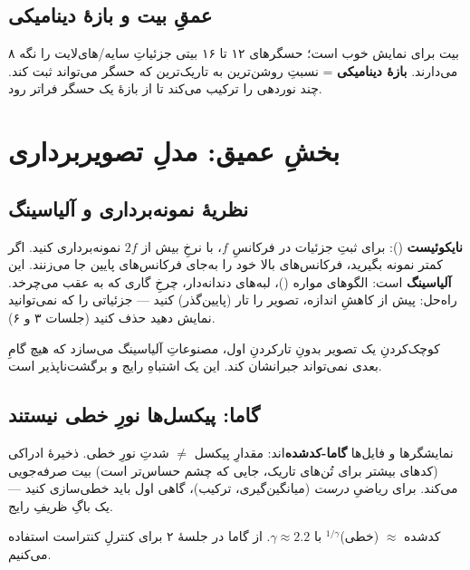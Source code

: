 \documentclass[12pt,a4paper]{article}
\begin{document}
\subsection{عمقِ بیت و بازهٔ دینامیکی}

۸ بیت برای نمایش خوب است؛ حسگرهای ۱۲ تا ۱۶ بیتی جزئیاتِ سایه/های‌لایت را نگه می‌دارند.
\textbf{بازهٔ دینامیکی} = نسبتِ روشن‌ترین به تاریک‌ترین که حسگر می‌تواند ثبت کند.  چند
نوردهی را ترکیب می‌کند تا از بازهٔ یک حسگر فراتر رود.

\section{بخشِ عمیق: مدلِ تصویربرداری}

\subsection{نظریهٔ نمونه‌برداری و آلیاسینگ}

\textbf{نایکوئیست} (): برای ثبتِ جزئیات در فرکانسِ $f$، با نرخِ بیش از $2f$
نمونه‌برداری کنید. اگر کمتر نمونه بگیرید، فرکانس‌های بالا خود را به‌جای فرکانس‌های پایین جا می‌زنند.
این \textbf{آلیاسینگ} است: الگوهای مواره ()، لبه‌های دندانه‌دار، چرخِ گاری که به عقب
می‌چرخد. راه‌حل: پیش از کاهشِ اندازه، تصویر را تار (پایین‌گذر) کنید — جزئیاتی را که نمی‌توانید
نمایش دهید حذف کنید (جلسات ۳ و ۶).

\begin{hoshdar}
کوچک‌کردنِ یک تصویر بدونِ تارکردنِ اول، مصنوعاتِ آلیاسینگ می‌سازد که هیچ گامِ بعدی نمی‌تواند
جبرانشان کند. این یک اشتباهِ رایج و برگشت‌ناپذیر است.
\end{hoshdar}

\subsection{گاما: پیکسل‌ها نورِ خطی نیستند}

نمایشگرها و فایل‌ها \textbf{گاما-کدشده}‌اند: مقدارِ پیکسل $\ne$ شدتِ نورِ خطی. ذخیرهٔ ادراکی
(کدهای بیشتر برای تُن‌های تاریک، جایی که چشم حساس‌تر است) بیت صرفه‌جویی می‌کند. برای ریاضیِ
\emph{درست} (میانگین‌گیری، ترکیب)، گاهی اول باید خطی‌سازی کنید — یک باگِ ظریفِ رایج.

\begin{riyazi}
کدشده $\approx$ (خطی)$^{1/\gamma}$ با $\gamma \approx 2.2$. از گاما در جلسهٔ ۲ برای کنترلِ
کنتراست استفاده می‌کنیم.
\end{riyazi}
\end{document}
